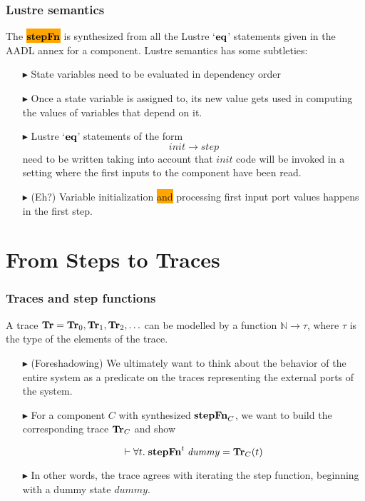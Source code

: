 \documentclass{beamer}
\newcommand{\kemph}[1]{\colorbox{orange}{#1}}
\newcommand{\konst}[1]{\ensuremath{\mbox{\bf{#1}}}}
\begin{document}
\begin{frame}\frametitle{Lustre semantics}

The \kemph{\konst{stepFn}} is synthesized from all the Lustre
`\konst{eq}' statements given in the AADL annex for a
component. Lustre semantics has some subtleties:

\begin{itemize}
\item [$\blacktriangleright$] State variables need to be evaluated in dependency order

\item [$\blacktriangleright$] Once a state variable is assigned to,
  its new value gets used in computing the values of variables that
  depend on it.

\item [$\blacktriangleright$] Lustre `\konst{eq}' statements of the form
\[ \mathit{init} \to \mathit{step}
\]
need to be written taking into account that $\mathit{init}$ code will
be invoked in a setting where the first inputs to the component have been read.

\item [$\blacktriangleright$] (Eh?) Variable initialization \kemph{and}
  processing first input port values happens in the first step.


\end{itemize}

\end{frame}

\section {From Steps to Traces}

\begin{frame}\frametitle{Traces and step functions}

A trace $\konst{Tr} = \konst{Tr}_0,\konst{Tr}_1,\konst{Tr}_2, \ldots$
can be modelled by a function $\mathbb{N}\to\tau$, where $\tau$ is the
type of the elements of the trace.

\begin{itemize}
\item [$\blacktriangleright$] (Foreshadowing) We ultimately want to
  think about the behavior of the entire system as a predicate on the
  traces representing the external ports of the system.

\item [$\blacktriangleright$] For a component $C$ with synthesized $\konst{stepFn}_{C}$, we
  want to build the corresponding trace $\konst{Tr}_{C}$ and show

\[ \vdash \forall t. \; \konst{stepFn}^{t}\;\mathit{dummy} = \konst{Tr}_{C}(t) \]

\item [$\blacktriangleright$] In other words, the trace agrees with
  iterating the step function, beginning with a dummy state
  $\mathit{dummy}$.

\end{itemize}

\end{frame}
\end{document}
